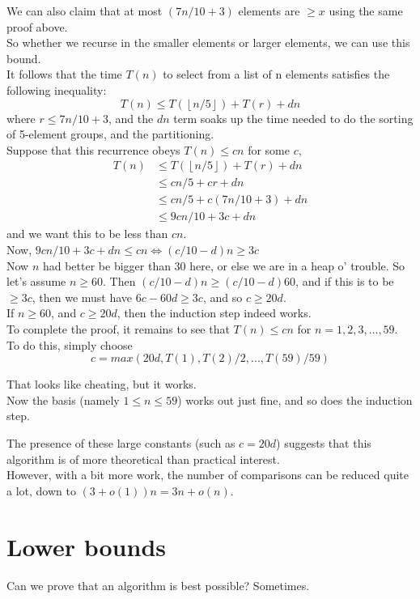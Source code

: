 \documentclass[12pt]{article}
\theoremstyle{plain}
\theoremstyle{definition}
\newcommand{\floor}[1]{\ensuremath{\left\lfloor #1 \right\rfloor}}
\begin{document}
We can also claim that at most $(7n/10 + 3)$ elements are $\geq x$ using the same proof above. \\
So whether we recurse in the smaller elements or larger elements, we can use this bound. \\

It follows that the time $T(n)$ to select from a list of n elements satisfies the following inequality:
$$T(n) \leq T(\floor{n/5}) + T(r) + dn$$
where $r \leq 7n/10 + 3$, and the $dn$ term soaks up the time needed to do the sorting of 5-element groups, and the partitioning. \\

Suppose that this recurrence obeys $T(n) \leq cn$ for some $c$,
\begin{align*}
T(n) &\leq T(\floor{n/5}) + T(r) + dn \\
&\leq cn/5 + cr + dn \\
&\leq cn/5 + c(7n/10 + 3) + dn \\
&\leq 9cn/10 + 3c + dn
\end{align*}
and we want this to be less than $cn$. \\

Now, $9cn/10 + 3c + dn \leq cn \iff (c/10 - d)n \geq 3c$ \\
Now $n$ had better be bigger than 30 here, or else we are in a heap o' trouble.
So let's assume $n \geq 60$. Then $(c/10 - d) n \geq (c/10 - d) 60$, and if this is to be $\geq 3c$, then we must have $6c - 60d \geq 3c$, and so $c \geq 20d$. \\
If $n \geq 60$, and $c \geq 20d$, then the induction step indeed works. \\

To complete the proof, it remains to see that $T(n) \leq cn$ for $n = 1, 2, 3, \dots, 59$. \\
To do this, simply choose
$$c = max(20d, T(1), T(2)/2, ..., T(59)/59)$$

That looks like cheating, but it works. \\
Now the basis (namely $1 \leq n \leq 59$) works out just fine, and so does the induction step.

The presence of these large constants (such as $c = 20d$) suggests that this algorithm is of more theoretical than practical interest. \\
However, with a bit more work, the number of comparisons can be reduced quite a lot, down to $(3+o(1))n = 3n + o(n)$. \label{sec:linear_select}

\newpage
\section{Lower bounds}
Can we prove that an algorithm is best possible?
Sometimes. \\
\end{document}
